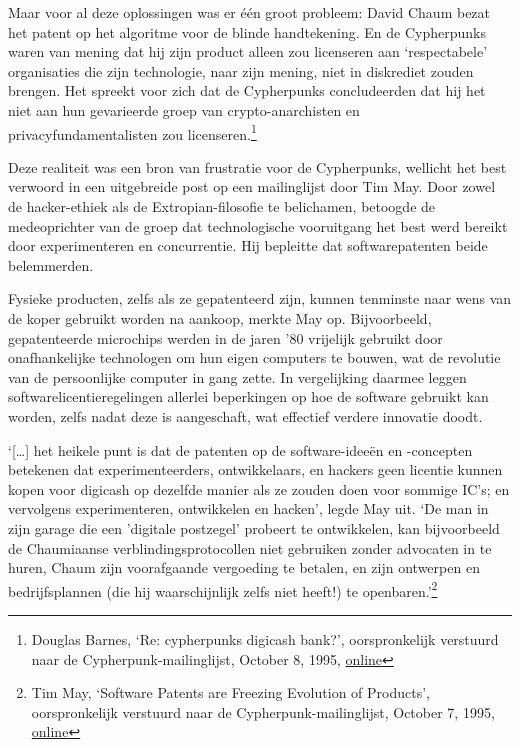 \documentclass[smalldemyvopaper,11pt,twoside,onecolumn,openright,extrafontsizes,hidelinks]{memoir}
\begin{document}
Maar voor al deze oplossingen was er één groot probleem: David Chaum
bezat het patent op het algoritme voor de blinde handtekening. En de
Cypherpunks waren van mening dat hij zijn product alleen zou licenseren
aan `respectabele' organisaties die zijn technologie, naar zijn mening,
niet in diskrediet zouden brengen. Het spreekt voor zich dat de
Cypherpunks concludeerden dat hij het niet aan hun gevarieerde groep van
crypto-anarchisten en privacyfundamentalisten zou licenseren.\footnote{Douglas
  Barnes, `Re: cypherpunks digicash bank?', oorspronkelijk verstuurd
  naar de Cypherpunk-mailinglijst, October 8, 1995,
  \href{https://cypherpunks.venona.com/date/1995/10/msg00731.html}{online}}

Deze realiteit was een bron van frustratie voor de Cypherpunks, wellicht
het best verwoord in een uitgebreide post op een mailinglijst door Tim
May. Door zowel de hacker-ethiek als de Extropian-filosofie te
belichamen, betoogde de medeoprichter van de groep dat technologische
vooruitgang het best werd bereikt door experimenteren en concurrentie.
Hij bepleitte dat softwarepatenten beide belemmerden.

Fysieke producten, zelfs als ze gepatenteerd zijn, kunnen tenminste naar
wens van de koper gebruikt worden na aankoop, merkte May op.
Bijvoorbeeld, gepatenteerde microchips werden in de jaren '80 vrijelijk
gebruikt door onafhankelijke technologen om hun eigen computers te
bouwen, wat de revolutie van de persoonlijke computer in gang zette. In
vergelijking daarmee leggen softwarelicentieregelingen allerlei
beperkingen op hoe de software gebruikt kan worden, zelfs nadat deze is
aangeschaft, wat effectief verdere innovatie doodt.

`{[}\ldots{]} het heikele punt is dat de patenten op de software-ideeën
en -concepten betekenen dat experimenteerders, ontwikkelaars, en hackers
geen licentie kunnen kopen voor digicash op dezelfde manier als ze
zouden doen voor sommige IC's; en vervolgens experimenteren, ontwikkelen
en hacken', legde May uit. `De man in zijn garage die een 'digitale
postzegel' probeert te ontwikkelen, kan bijvoorbeeld de Chaumiaanse
verblindingsprotocollen niet gebruiken zonder advocaten in te huren,
Chaum zijn voorafgaande vergoeding te betalen, en zijn ontwerpen en
bedrijfsplannen (die hij waarschijnlijk zelfs niet heeft!) te
openbaren.'\footnote{Tim May, `Software Patents are Freezing Evolution
  of Products', oorspronkelijk verstuurd naar de
  Cypherpunk-mailinglijst, October 7, 1995,
  \href{https://cypherpunks.venona.com/date/1995/10/msg00685.html}{online}}
\end{document}
